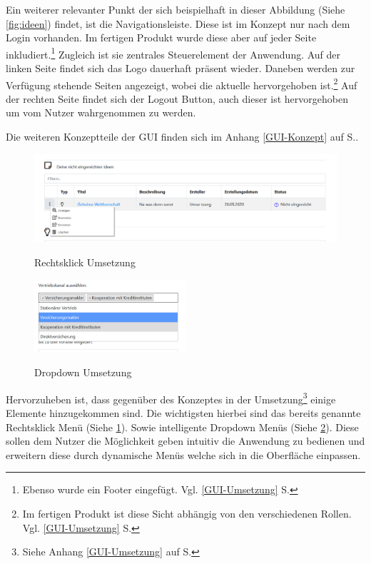 Ein weiterer relevanter Punkt der sich beispielhaft in dieser Abbildung (Siehe \cref{fig:ideen}) findet, ist die Navigationsleiste. Diese ist im Konzept nur nach dem Login vorhanden. Im fertigen Produkt wurde diese aber auf jeder Seite inkludiert.\footnote{Ebenso wurde ein Footer eingefügt. Vgl. \ref{GUI-Umsetzung} S.\pageref{GUI-Umsetzung}}
Zugleich ist sie zentrales Steuerelement der Anwendung. Auf der linken Seite findet sich das Logo dauerhaft präsent wieder. Daneben werden zur Verfügung stehende Seiten angezeigt, wobei die aktuelle hervorgehoben ist.\footnote{Im fertigen Produkt ist diese Sicht abhängig von den verschiedenen Rollen. Vgl. \ref{GUI-Umsetzung} S.\pageref{GUI-Umsetzung}} Auf der rechten Seite findet sich der Logout Button, auch dieser ist hervorgehoben um vom Nutzer wahrgenommen zu werden.

Die weiteren Konzeptteile der GUI finden sich im Anhang \ref{GUI-Konzept} auf S.\pageref{GUI-Konzept}.

\begin{figure}[h!!]
    \centering
    \begin{minipage}[t]{1\textwidth}
        \caption{Rechtsklick Umsetzung}
        \includegraphics[width=1\textwidth]{img/rechtsklick-umsetzung.png}\\
        \label{fig:rechtsklick}
    \end{minipage}
\end{figure}

\begin{figure}[h!!]
    \centering
    \begin{minipage}[t]{1\textwidth}
        \caption{Dropdown Umsetzung}
        \includegraphics[width=0.5\textwidth]{img/dropdown-umsetzung.png}\\
        \label{fig:dropdown}
    \end{minipage}
\end{figure}

Hervorzuheben ist, dass gegenüber des Konzeptes in der Umsetzung\footnote{Siehe Anhang \ref{GUI-Umsetzung} auf S.\pageref{GUI-Umsetzung}} einige Elemente hinzugekommen sind. Die wichtigsten hierbei sind das bereits genannte Rechtsklick Menü (Siehe \cref{fig:rechtsklick}). Sowie intelligente Dropdown Menüs (Siehe \cref{fig:dropdown}).
Diese sollen dem Nutzer die Möglichkeit geben intuitiv die Anwendung zu bedienen und erweitern diese durch dynamische Menüs welche sich in die Oberfläche einpassen.
